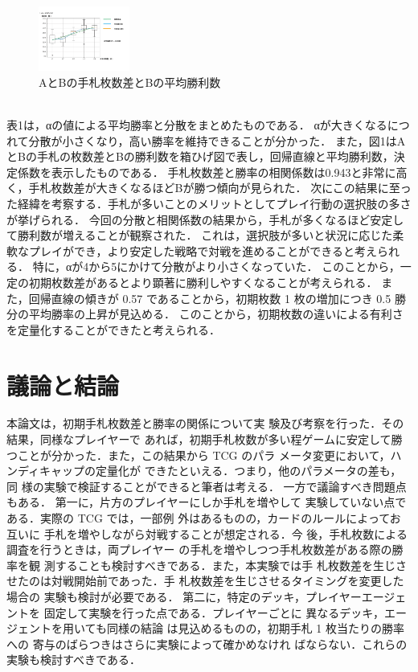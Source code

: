 \documentclass[twocolumn]{ltjsarticle}
\begin{document}
\begin{figure}[h]
  \includegraphics[width=30mm]{graph1.png}
  \caption{AとBの手札枚数差とBの平均勝利数}
  \end{figure}
\small{\leavevmode\\
表1は，αの値による平均勝率と分散をまとめたものである．
αが大きくなるにつれて分散が小さくなり，高い勝率を維持できることが分かった．
また，図1はAとBの手札の枚数差とBの勝利数を箱ひげ図で表し，回帰直線と平均勝利数，決定係数を表示したものである．
手札枚数差と勝率の相関係数は0.943と非常に高く，手札枚数差が大きくなるほどBが勝つ傾向が見られた．
次にこの結果に至った経緯を考察する．手札が多いことのメリットとしてプレイ行動の選択肢の多さが挙げられる．
今回の分散と相関係数の結果から，手札が多くなるほど安定して勝利数が増えることが観察された．
これは，選択肢が多いと状況に応じた柔軟なプレイができ，より安定した戦略で対戦を進めることができると考えられる．
特に，αが4から5にかけて分散がより小さくなっていた．
このことから，一定の初期枚数差があるとより顕著に勝利しやすくなることが考えられる．
また，回帰直線の傾きが 0.57 であることから，初期枚数 1 枚の増加につき 0.5 勝分の平均勝率の上昇が見込める．
このことから，初期枚数の違いによる有利さを定量化することができたと考えられる．
}

\section{議論と結論}
\small{
  本論文は，初期手札枚数差と勝率の関係について実
験及び考察を行った．その結果，同様なプレイヤーで
あれば，初期手札枚数が多い程ゲームに安定して勝
つことが分かった．また，この結果から TCG のパラ
メータ変更において，ハンディキャップの定量化が
できたといえる．つまり，他のパラメータの差も，同
様の実験で検証することができると筆者は考える．
一方で議論すべき問題点もある．
第一に，片方のプレイヤーにしか手札を増やして
実験していない点である．実際の TCG では，一部例
外はあるものの，カードのルールによってお互いに
手札を増やしながら対戦することが想定される．今
後，手札枚数による調査を行うときは，両プレイヤー
の手札を増やしつつ手札枚数差がある際の勝率を観
測することも検討すべきである．また，本実験では手
札枚数差を生じさせたのは対戦開始前であった．手
札枚数差を生じさせるタイミングを変更した場合の
実験も検討が必要である．
第二に，特定のデッキ，プレイヤーエージェントを
固定して実験を行った点である．プレイヤーごとに
異なるデッキ，エージェントを用いても同様の結論
は見込めるものの，初期手札 1 枚当たりの勝率への
寄与のばらつきはさらに実験によって確かめなけれ
ばならない．これらの実験も検討すべきである．
}
\end{document}

